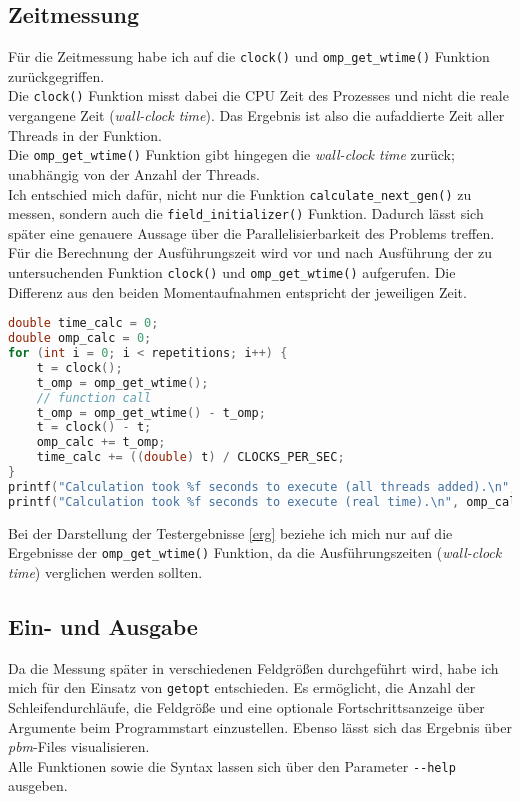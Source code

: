 \documentclass[german,plainarticle,hyperref,utf8]{zihpub}
\begin{document}
	\subsection{Zeitmessung}
	
	Für die Zeitmessung habe ich auf die \texttt{clock()} und \texttt{omp\_get\_wtime()} Funktion zurückgegriffen.\\
	
	Die \texttt{clock()} Funktion misst dabei die CPU Zeit des Prozesses und nicht die reale vergangene Zeit (\textit{wall-clock time}). Das Ergebnis ist also die aufaddierte Zeit aller Threads in der Funktion.\\
	
	Die \texttt{omp\_get\_wtime()} Funktion gibt hingegen die \textit{wall-clock time} zurück; unabhängig von der Anzahl der Threads.\\
	
	Ich entschied mich dafür, nicht nur die Funktion \texttt{calculate\_next\_gen()} zu messen, sondern auch die \texttt{field\_initializer()} Funktion. Dadurch lässt sich später eine genauere Aussage über die Parallelisierbarkeit des Problems treffen. Für die Berechnung der Ausführungszeit wird vor und nach Ausführung der zu untersuchenden Funktion \texttt{clock()} und \texttt{omp\_get\_wtime()} aufgerufen. Die Differenz aus den beiden Momentaufnahmen entspricht der jeweiligen Zeit.\\
	\newpage
	\begin{lstlisting}[language=C, caption=Berechnung der Ausführungszeit eines \textit{function calls}]
double time_calc = 0;
double omp_calc = 0;
for (int i = 0; i < repetitions; i++) {
	t = clock();
	t_omp = omp_get_wtime();
	// function call
	t_omp = omp_get_wtime() - t_omp;
	t = clock() - t;
	omp_calc += t_omp;
	time_calc += ((double) t) / CLOCKS_PER_SEC;
}
printf("Calculation took %f seconds to execute (all threads added).\n", time_calc);
printf("Calculation took %f seconds to execute (real time).\n", omp_calc);
\end{lstlisting}

	Bei der Darstellung der Testergebnisse \ref{erg} beziehe ich mich nur auf die Ergebnisse der \texttt{omp\_get\_wtime()} Funktion, da die Ausführungszeiten (\textit{wall-clock time}) verglichen werden sollten.
	
	\subsection{Ein- und Ausgabe}
	Da die Messung später in verschiedenen Feldgrößen durchgeführt wird, habe ich mich für den Einsatz von \verb|getopt| entschieden. Es ermöglicht, die Anzahl der Schleifendurchläufe, die Feldgröße und eine optionale Fortschrittsanzeige über Argumente beim Programmstart einzustellen.
	Ebenso lässt sich das Ergebnis über \textit{pbm}-Files visualisieren.\\
	Alle Funktionen sowie die Syntax lassen sich über den Parameter \texttt{-{}-help} ausgeben.
	\newpage
\end{document}
